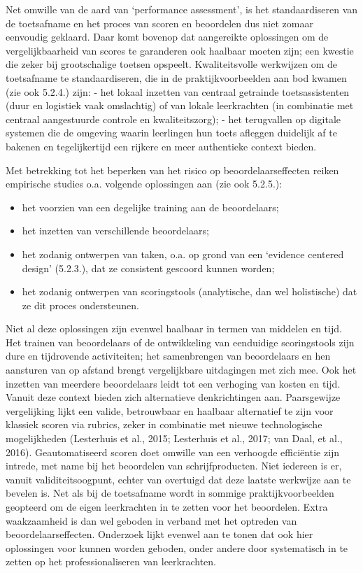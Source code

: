 \documentclass[
  letterpaper,
]{report}
\providecommand{\tightlist}{%
  \setlength{\itemsep}{0pt}\setlength{\parskip}{0pt}}
\begin{document}
Net omwille van de aard van `performance assessment', is het
standaardiseren van de toetsafname en het proces van scoren en
beoordelen dus niet zomaar eenvoudig geklaard. Daar komt bovenop dat
aangereikte oplossingen om de vergelijkbaarheid van scores te garanderen
ook haalbaar moeten zijn; een kwestie die zeker bij grootschalige
toetsen opspeelt. Kwaliteitsvolle werkwijzen om de toetsafname te
standaardiseren, die in de praktijkvoorbeelden aan bod kwamen (zie ook
5.2.4.) zijn: - het lokaal inzetten van centraal getrainde
toetsassistenten (duur en logistiek vaak omslachtig) of van lokale
leerkrachten (in combinatie met centraal aangestuurde controle en
kwaliteitszorg); - het terugvallen op digitale systemen die de omgeving
waarin leerlingen hun toets afleggen duidelijk af te bakenen en
tegelijkertijd een rijkere en meer authentieke context bieden.

Met betrekking tot het beperken van het risico op beoordelaarseffecten
reiken empirische studies o.a. volgende oplossingen aan (zie ook
5.2.5.):

\begin{itemize}
\tightlist
\item
  het voorzien van een degelijke training aan de beoordelaars;
\item
  het inzetten van verschillende beoordelaars;
\item
  het zodanig ontwerpen van taken, o.a. op grond van een `evidence
  centered design' (5.2.3.), dat ze consistent gescoord kunnen worden;
\item
  het zodanig ontwerpen van scoringstools (analytische, dan wel
  holistische) dat ze dit proces ondersteunen.
\end{itemize}

Niet al deze oplossingen zijn evenwel haalbaar in termen van middelen en
tijd. Het trainen van beoordelaars of de ontwikkeling van eenduidige
scoringstools zijn dure en tijdrovende activiteiten; het samenbrengen
van beoordelaars en hen aansturen van op afstand brengt vergelijkbare
uitdagingen met zich mee. Ook het inzetten van meerdere beoordelaars
leidt tot een verhoging van kosten en tijd. Vanuit deze context bieden
zich alternatieve denkrichtingen aan. Paarsgewijze vergelijking lijkt
een valide, betrouwbaar en haalbaar alternatief te zijn voor klassiek
scoren via rubrics, zeker in combinatie met nieuwe technologische
mogelijkheden (Lesterhuis et al., 2015; Lesterhuis et al., 2017; van
Daal, et al., 2016). Geautomatiseerd scoren doet omwille van een
verhoogde efficiëntie zijn intrede, met name bij het beoordelen van
schrijfproducten. Niet iedereen is er, vanuit validiteitsoogpunt, echter
van overtuigd dat deze laatste werkwijze aan te bevelen is. Net als bij
de toetsafname wordt in sommige praktijkvoorbeelden geopteerd om de
eigen leerkrachten in te zetten voor het beoordelen. Extra waakzaamheid
is dan wel geboden in verband met het optreden van beoordelaarseffecten.
Onderzoek lijkt evenwel aan te tonen dat ook hier oplossingen voor
kunnen worden geboden, onder andere door systematisch in te zetten op
het professionaliseren van leerkrachten.
\end{document}
